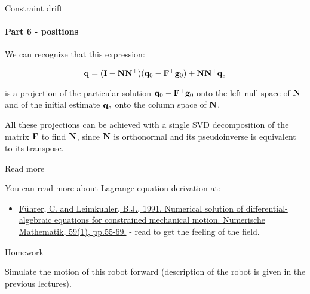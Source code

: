 \documentclass{beamer}
\begin{document}
\begin{frame}{Constraint drift}
\framesubtitle{Part 6 - positions}
\begin{flushleft}

We can recognize that this expression:

\begin{equation}
   \mathbf{q}  = (\mathbf{I} - \mathbf{N}\mathbf{N}^+) (\mathbf{q}_0 - \mathbf{F}^+\mathbf{g}_0) + \mathbf{N}\mathbf{N}^+\mathbf{q}_e
\end{equation}

is a projection of the particular solution $\mathbf{q}_0 - \mathbf{F}^+\mathbf{g}_0$ onto the left null space of $\mathbf{N}$ and of the initial estimate $\mathbf{q}_e$ onto the column space of $\mathbf{N}$.

\bigskip

All these projections can be achieved with a single SVD decomposition of the matrix $\mathbf{F}$ to find $\mathbf{N}$, since $\mathbf{N}$ is orthonormal and its pseudoinverse is equivalent to its transpose.

\end{flushleft}
\end{frame}




\begin{frame}{Read more}
\begin{flushleft}

You can read more about Lagrange equation derivation at:

\begin{itemize}
    \item \href{https://idp.springer.com/authorize/casa?redirect_uri=https://link.springer.com/content/pdf/10.1007/BF01385770.pdf&casa_token=Qba9ilJAgVkAAAAA:qXdlKw8Au9f4ZzDqbNKCo5dg5q_vFeQVVCHqbshd1rmld1nKTUoaCzZR-w_SfgQYL9d_GqfhYZOyn5RpZw}{Führer, C. and Leimkuhler, B.J., 1991. Numerical solution of differential-algebraic equations for constrained mechanical motion. Numerische Mathematik, 59(1), pp.55-69.} - read to get the feeling of the field.
\end{itemize}

\end{flushleft}
\end{frame}


\begin{frame}{Homework}
\begin{flushleft}

Simulate the motion of this robot forward (description of the robot is given in the previous lectures).

\begin{figure}
    \centering
    
\end{figure}

\end{flushleft}
\end{frame}
\end{document}
